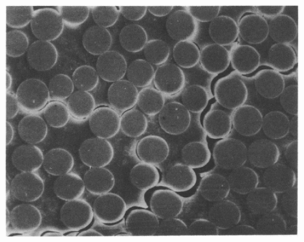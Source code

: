 \hfill
\begin{subfigure}{0.32\linewidth}
  \setlength{\figwidth}{\linewidth}
  \centering
  \includegraphics[width=\figwidth,height=\figheight,keepaspectratio]{Exp_RVE_PanTY}
  \caption{\cite{PanTY1988}}%
  \label{fig:Exp:RVE:PanTY}
\end{subfigure}%